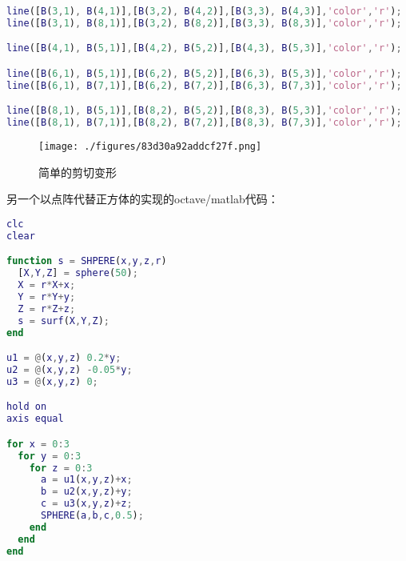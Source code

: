\begin{lstlisting}[language=matlab]
line([B(3,1), B(4,1)],[B(3,2), B(4,2)],[B(3,3), B(4,3)],'color','r');
line([B(3,1), B(8,1)],[B(3,2), B(8,2)],[B(3,3), B(8,3)],'color','r');

line([B(4,1), B(5,1)],[B(4,2), B(5,2)],[B(4,3), B(5,3)],'color','r');

line([B(6,1), B(5,1)],[B(6,2), B(5,2)],[B(6,3), B(5,3)],'color','r');
line([B(6,1), B(7,1)],[B(6,2), B(7,2)],[B(6,3), B(7,3)],'color','r');

line([B(8,1), B(5,1)],[B(8,2), B(5,2)],[B(8,3), B(5,3)],'color','r');
line([B(8,1), B(7,1)],[B(8,2), B(7,2)],[B(8,3), B(7,3)],'color','r');

\end{lstlisting}

\begin{figure}[ht]
\centering
\texttt{[image: ./figures/83d30a92addcf27f.png]}
\caption{简单的剪切变形} \label{fig_Strain_10}
\end{figure}

另一个以点阵代替正方体的实现的octave/matlab代码：
\begin{lstlisting}[language=matlab]
clc
clear

function s = SHPERE(x,y,z,r)
  [X,Y,Z] = sphere(50);
  X = r*X+x;
  Y = r*Y+y;
  Z = r*Z+z;
  s = surf(X,Y,Z);
end

u1 = @(x,y,z) 0.2*y;
u2 = @(x,y,z) -0.05*y;
u3 = @(x,y,z) 0;

hold on
axis equal

for x = 0:3
  for y = 0:3
    for z = 0:3
      a = u1(x,y,z)+x;
      b = u2(x,y,z)+y;
      c = u3(x,y,z)+z;
      SPHERE(a,b,c,0.5);
    end
  end
end
\end{lstlisting}
